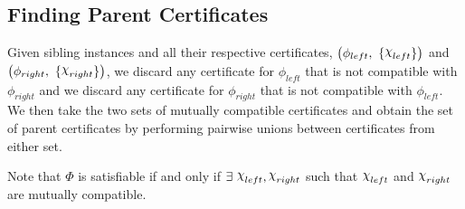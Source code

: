 \subsection{Finding Parent Certificates}
\label{subsec:finding-parent-certificates}

Given sibling instances and all their respective certificates, $\big(\phi_{left},~ \{ \rchi_{left} \}\big)$ and $\big(\phi_{right},~ \{ \rchi_{right} \}\big)$, we discard any certificate for $\phi_{left}$ that is not compatible with $\phi_{right}$ and we discard any certificate for $\phi_{right}$ that is not compatible with $\phi_{left}$.
We then take the two sets of mutually compatible certificates and obtain the set of parent certificates by performing pairwise unions between certificates from either set.

Note that $\Phi$ is satisfiable if and only if $\exists~ \rchi_{left}, \rchi_{right}$ such that $\rchi_{left}$ and $\rchi_{right}$ are mutually compatible.
